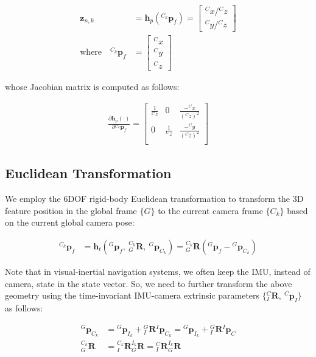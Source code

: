 \begin{align*} \mathbf{z}_{n,k} &= \mathbf h_p ({}^{C_k}\mathbf{p}_f) = \begin{bmatrix} {}^Cx/{}^Cz \\ {}^Cy/{}^Cz \end{bmatrix} \\ \text{where} \quad {}^{C_k}\mathbf{p}_f &= \begin{bmatrix} {}^Cx \\ {}^Cy \\ {}^Cz \end{bmatrix} \end{align*}

whose Jacobian matrix is computed as follows\+:

\begin{align*} \frac{\partial \mathbf h_p (\cdot)}{\partial {}^{C_k}\mathbf{p}_f} = \begin{bmatrix} \frac{1}{{}^Cz} & 0 & \frac{-{}^Cx}{({}^Cz)^2} \\ 0 & \frac{1}{{}^Cz} & \frac{-{}^Cy}{({}^Cz)^2} \\ \end{bmatrix} \end{align*}\hypertarget{update-feat_relative}{}\subsection{Euclidean Transformation}\label{update-feat_relative}
We employ the 6\+D\+OF rigid-\/body Euclidean transformation to transform the 3D feature position in the global frame $\{G\}$ to the current camera frame $\{C_k\}$ based on the current global camera pose\+:

\begin{align*} {}^{C_k}\mathbf{p}_f &= \mathbf h_t ({}^{G}\mathbf{p}_f,~{}^{C_k}_{G}\mathbf{R},~{}^{G}\mathbf{p}_{C_k}) = {}^{C_k}_{G}\mathbf{R}({}^{G}\mathbf{p}_f-{}^{G}\mathbf{p}_{C_k}) \end{align*}

Note that in visual-\/inertial navigation systems, we often keep the I\+MU, instead of camera, state in the state vector. So, we need to further transform the above geometry using the time-\/invariant I\+M\+U-\/camera extrinsic parameters $\{ {}^{C}_{I}\mathbf{R}, ~{}^{C}\mathbf{p}_I \}$ as follows\+:

\begin{align*} {}^{G}\mathbf{p}_{C_k} &= {}^{G}\mathbf{p}_{I_k} + {}^{G}_{I}\mathbf{R} {}^{I}\mathbf{p}_{C_k} = {}^{G}\mathbf{p}_{I_k} + {}^{G}_{I}\mathbf{R} {}^{I}\mathbf{p}_{C} \\ {}^{C_k}_{G}\mathbf{R} &= {}^{C_k}_{I}\mathbf{R} {}^{I_k}_{G}\mathbf{R} = {}^{C}_{I}\mathbf{R} {}^{I_k}_{G}\mathbf{R} \end{align*}

